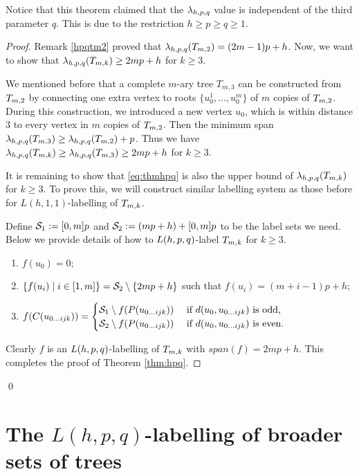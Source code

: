 Notice that this theorem claimed that the $\lambda_{h,p,q}$ value is independent of the third parameter $q$. This is due to the restriction $h \ge p \ge q \ge 1$. 
\\
\begin{proof}
Remark \ref{hpqtm2} proved that $\lamhpq(\tm2) = (2m-1)p+h$. Now, we want to show that $\lambda_{h,p,q}(T_{m,k}) \ge 2mp+h$ for $k \ge 3$. 

We mentioned before that a complete $m$-ary tree $T_{m, 3}$ can be constructed from $\tm2$ by connecting one extra vertex to roots $\{u_0^1, \dots, u_0^m\}$ of $m$ copies of $\tm2$. During this construction, we introduced a new vertex $u_0$, which is within distance $3$ to every vertex in $m$ copies of $\tm2$. Then the minimum span $\lamhpq(T_{m,3}) \ge \lamhpq(\tm2) + p$. Thus we have $\lambda_{h,p,q}(T_{m,k}) \ge \lambda_{h,p,q}(T_{m,3}) \ge 2mp+h$ for $k \ge 3$. 

It is remaining to show that \eqref{eq:thmhpq} is also the upper bound of $\lambda_{h,p,q}(T_{m,k})$ for $k \ge 3$. To prove this, we will construct similar labelling system as those before for $L(h,1,1)$-labelling of $T_{m,k}$. 

Define ${\cal S}_1: = [0,m]p$ and ${\cal S}_2 := (mp+h)+[0,m]p$ to be the label sets we need. Below we provide details of how to $L(h,p,q)$-label $T_{m,k}$ for $k \ge 3$. 
\begin{enumerate}[(1)]
\item $f(u_0) = 0$;
\item $\{f(u_i) \mid i \in [1,m]\} = {\cal S}_2 \setminus \{2mp+h\}$ such that $f(u_i) =(m+i-1)p+h$;
\item $f(C(u_{0 \dots ijk})) =
 \begin{cases}
 {\cal S}_1 \setminus f(P(u_{0 \dots ijk})) & \text{ if } d(u_0, u_{0\dots ijk}) \text{ is odd, } \\
 {\cal S}_2 \setminus f(P(u_{0 \dots ijk})) & \text{ if } d(u_0, u_{0\dots ijk}) \text{ is even.} 
 \end{cases}$
\end{enumerate}

Clearly $f$ is an $L(h,p,q)$-labelling of $T_{m,k}$ with $span(f) = 2mp+h$. This completes the proof of Theorem \ref{thm:hpq}. 
\end{proof}
\qed





\section{The $L(h,p,q)$-labelling of broader sets of trees}

